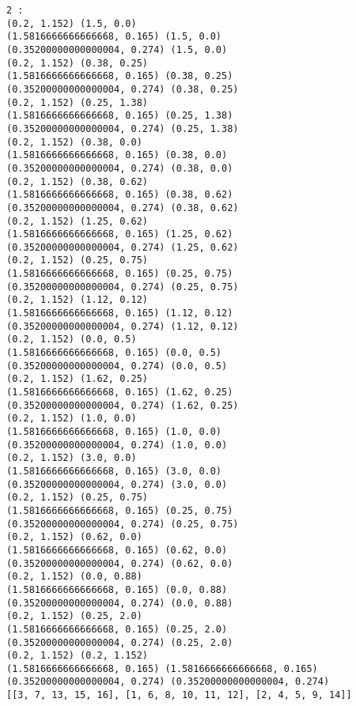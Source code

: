 \documentclass[11pt]{article}
\begin{document}
\begin{Verbatim}[commandchars=\\\{\}]
 2 :
(0.2, 1.152) (1.5, 0.0)
(1.5816666666666668, 0.165) (1.5, 0.0)
(0.35200000000000004, 0.274) (1.5, 0.0)
(0.2, 1.152) (0.38, 0.25)
(1.5816666666666668, 0.165) (0.38, 0.25)
(0.35200000000000004, 0.274) (0.38, 0.25)
(0.2, 1.152) (0.25, 1.38)
(1.5816666666666668, 0.165) (0.25, 1.38)
(0.35200000000000004, 0.274) (0.25, 1.38)
(0.2, 1.152) (0.38, 0.0)
(1.5816666666666668, 0.165) (0.38, 0.0)
(0.35200000000000004, 0.274) (0.38, 0.0)
(0.2, 1.152) (0.38, 0.62)
(1.5816666666666668, 0.165) (0.38, 0.62)
(0.35200000000000004, 0.274) (0.38, 0.62)
(0.2, 1.152) (1.25, 0.62)
(1.5816666666666668, 0.165) (1.25, 0.62)
(0.35200000000000004, 0.274) (1.25, 0.62)
(0.2, 1.152) (0.25, 0.75)
(1.5816666666666668, 0.165) (0.25, 0.75)
(0.35200000000000004, 0.274) (0.25, 0.75)
(0.2, 1.152) (1.12, 0.12)
(1.5816666666666668, 0.165) (1.12, 0.12)
(0.35200000000000004, 0.274) (1.12, 0.12)
(0.2, 1.152) (0.0, 0.5)
(1.5816666666666668, 0.165) (0.0, 0.5)
(0.35200000000000004, 0.274) (0.0, 0.5)
(0.2, 1.152) (1.62, 0.25)
(1.5816666666666668, 0.165) (1.62, 0.25)
(0.35200000000000004, 0.274) (1.62, 0.25)
(0.2, 1.152) (1.0, 0.0)
(1.5816666666666668, 0.165) (1.0, 0.0)
(0.35200000000000004, 0.274) (1.0, 0.0)
(0.2, 1.152) (3.0, 0.0)
(1.5816666666666668, 0.165) (3.0, 0.0)
(0.35200000000000004, 0.274) (3.0, 0.0)
(0.2, 1.152) (0.25, 0.75)
(1.5816666666666668, 0.165) (0.25, 0.75)
(0.35200000000000004, 0.274) (0.25, 0.75)
(0.2, 1.152) (0.62, 0.0)
(1.5816666666666668, 0.165) (0.62, 0.0)
(0.35200000000000004, 0.274) (0.62, 0.0)
(0.2, 1.152) (0.0, 0.88)
(1.5816666666666668, 0.165) (0.0, 0.88)
(0.35200000000000004, 0.274) (0.0, 0.88)
(0.2, 1.152) (0.25, 2.0)
(1.5816666666666668, 0.165) (0.25, 2.0)
(0.35200000000000004, 0.274) (0.25, 2.0)
(0.2, 1.152) (0.2, 1.152)
(1.5816666666666668, 0.165) (1.5816666666666668, 0.165)
(0.35200000000000004, 0.274) (0.35200000000000004, 0.274)
[[3, 7, 13, 15, 16], [1, 6, 8, 10, 11, 12], [2, 4, 5, 9, 14]]

    \end{Verbatim}
\end{document}
